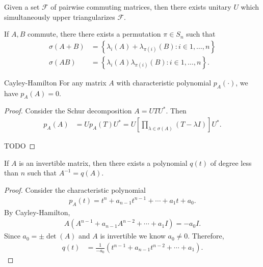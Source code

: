 \begin{cor}
    Given a set $\mathscr{F}$ of pairwise commuting matrices, then there exists unitary $U$ which simultaneously upper triangularizes $\mathscr{F}$.
\end{cor}

\begin{cor}
    If $A, B$ commute, there there exists a permutation $\pi \in S_{n}$ such that
    \begin{align*}
        \sigma(A + B) &= \left\{\lambda_{i}(A) + \lambda_{\pi(i)}(B) : i \in 1, \ldots, n\right\} \\
        \sigma(AB) &= \left\{\lambda_{i}(A)\lambda_{\pi(i)}(B) : i \in 1, \ldots, n\right\}.
    \end{align*}
\end{cor}

\begin{thm}{Cayley-Hamilton}\label{thm:cayley-hamilton}\proofbreak
    For any matrix $A$ with characteristic polynomial $p_A(\cdot)$, we have $p_A(A) = 0$.
\end{thm}

\begin{proof}
    Consider the Schur decomposition $A = UTU^{*}$. Then
    \begin{align*}
        p_{A}(A) &= Up_{A}(T)U^{*} = U\left[\prod_{\lambda \in \sigma(A)}(T-\lambda I)\right]U^{*}.
    \end{align*}

    {\color{red}\Large TODO}
\end{proof}

\begin{cor}
    If $A$ is an invertible matrix, then there exists a polynomial $q(t)$ of degree less than $n$ such that $A^{-1} = q(A)$.
\end{cor}

\begin{proof}
    Consider the characteristic polynomial
    \begin{align*}
        p_A(t) = t^n + a_{n-1}t^{n-1} + \cdots + a_1t + a_0.
    \end{align*}
    By Cayley-Hamilton,
    \begin{align*}
        A\left(A^{n-1} + a_{n-1}A^{n-2} + \cdots + a_1I\right) = -a_0I.
    \end{align*}
    Since $a_0 = \pm\det(A)$ and $A$ is invertible we know $a_0 \neq 0$. Therefore,
    \begin{align*}
        q(t) &= \frac{1}{-a_0}\left(t^{n-1} + a_{n-1}t^{n-2} + \cdots + a_1\right).
    \end{align*}
\end{proof}

